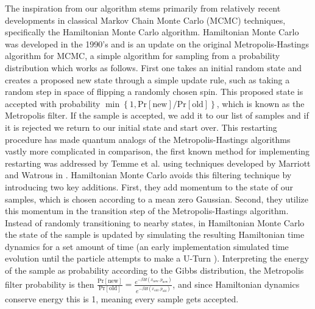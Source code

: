 \documentclass{article}
\newcommand{\set}[1]{\left\{ #1 \right\}}
\newcommand{\prob}[1]{\text{Pr}\left[ #1 \right]}
\begin{document}
The inspiration from our algorithm stems primarily from relatively recent developments in classical Markov Chain Monte Carlo (MCMC) techniques, specifically the Hamiltonian Monte Carlo algorithm. Hamiltonian Monte Carlo was developed in the 1990's and is an update on the original Metropolis-Hastings algorithm for MCMC, a simple algorithm for sampling from a probability distribution which works as follows. First one takes an initial random state and creates a proposed new state through a simple update rule, such as taking a random step in space of flipping a randomly chosen spin. This proposed state is accepted with probability $\min \set{1, \prob{\text{new}} / \prob{\text{old}}}$, which is known as the Metropolis filter. If the sample is accepted, we add it to our list of samples and if it is rejected we return to our initial state and start over. This restarting procedure has made quantum analogs of the Metropolis-Hastings algorithms vastly more complicated in comparison, the first known method for implementing restarting was addressed by Temme et al. \cite{temme2011} using techniques developed by Marriott and Watrous in \cite{marriott2005quantum}. Hamiltonian
Monte Carlo avoids this filtering technique by introducing two key additions. First, they add momentum to the state of our samples, which is chosen according to a mean zero Gaussian. Second, they utilize this momentum in the transition step of the Metropolis-Hastings algorithm. Instead of randomly transitioning to nearby states, in Hamiltonian Monte Carlo the state of the sample is updated by simulating the resulting Hamiltonian time dynamics for a set amount of time (an early implementation simulated time evolution until the particle attempts to make a U-Turn \cite{hoffman2011nouturnsampleradaptivelysetting}). Interpreting the energy of the sample as probability according to the Gibbs distribution, the Metropolis filter probability is then $\frac{\prob{\text{new}}}{\prob{\text{old}}} = \frac{e^{-\beta H(x_{\text{new}}, p_{\text{new}}) }}{e^{-\beta H(x_{\text{old}}, p_{\text{old}}) }}$, and since Hamiltonian dynamics conserve energy this is 1, meaning every sample gets accepted.
\end{document}
